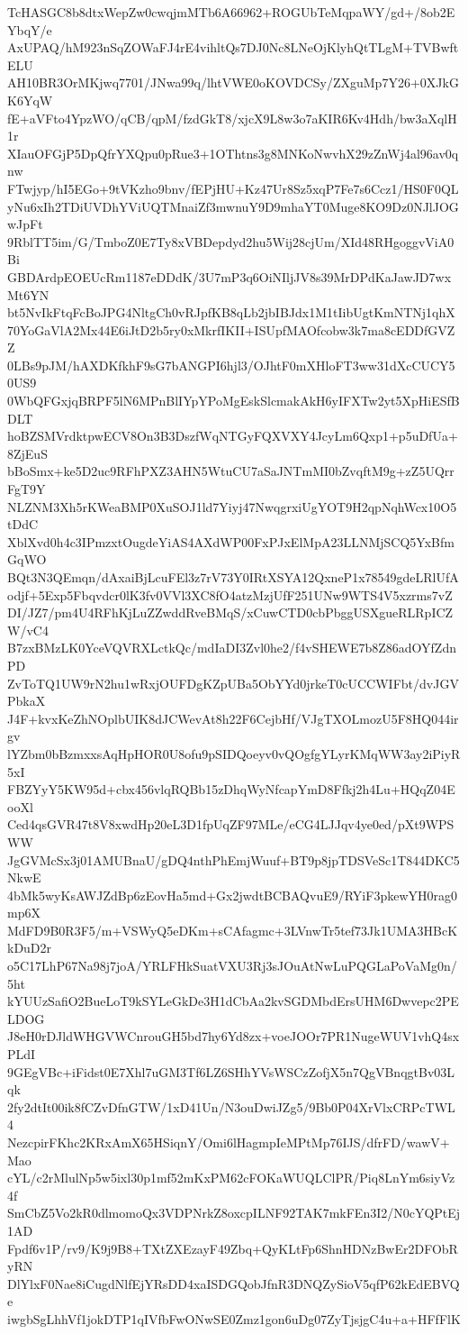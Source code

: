 TcHASGC8b8dtxWepZw0cwqjmMTb6A66962+ROGUbTeMqpaWY/gd+/8ob2EYbqY/e
AxUPAQ/hM923nSqZOWaFJ4rE4vihltQs7DJ0Nc8LNeOjKlyhQtTLgM+TVBwftELU
AH10BR3OrMKjwq7701/JNwa99q/lhtVWE0oKOVDCSy/ZXguMp7Y26+0XJkGK6YqW
fE+aVFto4YpzWO/qCB/qpM/fzdGkT8/xjcX9L8w3o7aKIR6Kv4Hdh/bw3aXqlH1r
XIauOFGjP5DpQfrYXQpu0pRue3+1OThtns3g8MNKoNwvhX29zZnWj4al96av0qnw
FTwjyp/hI5EGo+9tVKzho9bnv/fEPjHU+Kz47Ur8Sz5xqP7Fe7s6Ccz1/HS0F0QL
yNu6xIh2TDiUVDhYViUQTMnaiZf3mwnuY9D9mhaYT0Muge8KO9Dz0NJlJOGwJpFt
9RblTT5im/G/TmboZ0E7Ty8xVBDepdyd2hu5Wij28cjUm/XId48RHgoggvViA0Bi
GBDArdpEOEUcRm1187eDDdK/3U7mP3q6OiNIljJV8s39MrDPdKaJawJD7wxMt6YN
bt5NvIkFtqFcBoJPG4NltgCh0vRJpfKB8qLb2jbIBJdx1M1tIibUgtKmNTNj1qhX
70YoGaVlA2Mx44E6iJtD2b5ry0xMkrfIKII+ISUpfMAOfcobw3k7ma8cEDDfGVZZ
0LBs9pJM/hAXDKfkhF9sG7bANGPI6hjl3/OJhtF0mXHloFT3ww31dXcCUCY50US9
0WbQFGxjqBRPF5lN6MPnBlIYpYPoMgEskSlcmakAkH6yIFXTw2yt5XpHiESfBDLT
hoBZSMVrdktpwECV8On3B3DszfWqNTGyFQXVXY4JcyLm6Qxp1+p5uDfUa+8ZjEuS
bBoSmx+ke5D2uc9RFhPXZ3AHN5WtuCU7aSaJNTmMI0bZvqftM9g+zZ5UQrrFgT9Y
NLZNM3Xh5rKWeaBMP0XuSOJ1ld7Yiyj47NwqgrxiUgYOT9H2qpNqhWcx10O5tDdC
XblXvd0h4c3IPmzxtOugdeYiAS4AXdWP00FxPJxElMpA23LLNMjSCQ5YxBfmGqWO
BQt3N3QEmqn/dAxaiBjLcuFEl3z7rV73Y0IRtXSYA12QxneP1x78549gdeLRlUfA
odjf+5Exp5Fbqvdcr0lK3fv0VVl3XC8fO4atzMzjUfF251UNw9WTS4V5xzrms7vZ
DI/JZ7/pm4U4RFhKjLuZZwddRveBMqS/xCuwCTD0cbPbggUSXgueRLRpICZW/vC4
B7zxBMzLK0YceVQVRXLctkQc/mdIaDI3Zvl0he2/f4vSHEWE7b8Z86adOYfZdnPD
ZvToTQ1UW9rN2hu1wRxjOUFDgKZpUBa5ObYYd0jrkeT0cUCCWIFbt/dvJGVPbkaX
J4F+kvxKeZhNOplbUIK8dJCWevAt8h22F6CejbHf/VJgTXOLmozU5F8HQ044irgv
lYZbm0bBzmxxsAqHpHOR0U8ofu9pSIDQoeyv0vQOgfgYLyrKMqWW3ay2iPiyR5xI
FBZYyY5KW95d+cbx456vlqRQBb15zDhqWyNfcapYmD8Ffkj2h4Lu+HQqZ04EooXl
Ced4qsGVR47t8V8xwdHp20eL3D1fpUqZF97MLe/eCG4LJJqv4ye0ed/pXt9WPSWW
JgGVMcSx3j01AMUBnaU/gDQ4nthPhEmjWuuf+BT9p8jpTDSVeSc1T844DKC5NkwE
4bMk5wyKsAWJZdBp6zEovHa5md+Gx2jwdtBCBAQvuE9/RYiF3pkewYH0rag0mp6X
MdFD9B0R3F5/m+VSWyQ5eDKm+sCAfagmc+3LVnwTr5tef73Jk1UMA3HBcKkDuD2r
o5C17LhP67Na98j7joA/YRLFHkSuatVXU3Rj3sJOuAtNwLuPQGLaPoVaMg0n/5ht
kYUUzSafiO2BueLoT9kSYLeGkDe3H1dCbAa2kvSGDMbdErsUHM6Dwvepc2PELDOG
J8eH0rDJldWHGVWCnrouGH5bd7hy6Yd8zx+voeJOOr7PR1NugeWUV1vhQ4sxPLdI
9GEgVBc+iFidst0E7Xhl7uGM3Tf6LZ6SHhYVsWSCzZofjX5n7QgVBnqgtBv03Lqk
2fy2dtIt00ik8fCZvDfnGTW/1xD41Un/N3ouDwiJZg5/9Bb0P04XrVlxCRPcTWL4
NezcpirFKhc2KRxAmX65HSiqnY/Omi6lHagmpIeMPtMp76IJS/dfrFD/wawV+Mao
cYL/c2rMlulNp5w5ixl30p1mf52mKxPM62cFOKaWUQLClPR/Piq8LnYm6siyVz4f
SmCbZ5Vo2kR0dlmomoQx3VDPNrkZ8oxcpILNF92TAK7mkFEn3I2/N0cYQPtEj1AD
Fpdf6v1P/rv9/K9j9B8+TXtZXEzayF49Zbq+QyKLtFp6ShnHDNzBwEr2DFObRyRN
DlYlxF0Nae8iCugdNlfEjYRsDD4xaISDGQobJfnR3DNQZySioV5qfP62kEdEBVQe
iwgbSgLhhVf1jokDTP1qIVfbFwONwSE0Zmz1gon6uDg07ZyTjsjgC4u+a+HFfFlK
